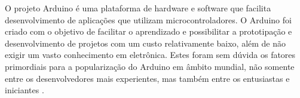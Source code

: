 \documentclass[12pt]{uftpibicsic2018}
\begin{document}




O projeto Arduino é uma plataforma de hardware e software que facilita desenvolvimento de aplicações que utilizam microcontroladores. O Arduino foi criado com o objetivo de facilitar o aprendizado e possibilitar a prototipação e desenvolvimento de projetos com um custo relativamente baixo, além de não exigir um vasto conhecimento em eletrônica. Estes foram sem dúvida os fatores primordiais para a popularização do Arduino em âmbito mundial, não somente entre os desenvolvedores mais experientes, mas também entre os entusiastas e iniciantes \cite{marcos}.

\end{document}

